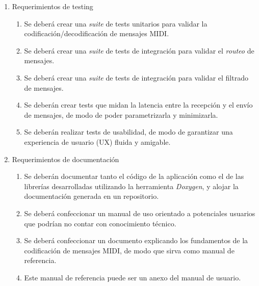 \documentclass[
11pt, %
]{charter}
\begin{document}
\begin{enumerate}
	\item Requerimientos de testing
	\begin{enumerate}
		\item Se deberá crear una \emph{suite} de tests unitarios para validar la codificación/decodificación de mensajes MIDI.
		\item Se deberá crear una \emph{suite} de tests de integración para validar el \emph{routeo} de mensajes.
		\item Se deberá crear una \emph{suite} de tests de integración para validar el filtrado de mensajes.
		\item Se deberán crear tests que midan la latencia entre la recepción y el envío de mensajes, de modo de poder parametrizarla y minimizarla.
		\item Se deberán realizar tests de usabilidad, de modo de garantizar una experiencia de usuario (UX) fluida y amigable.
	\end{enumerate}
	\item Requerimientos de documentación
	\begin{enumerate}
		\item Se deberán documentar tanto el código de la aplicación como el de las librerías desarrolladas utilizando la herramienta \emph{Doxygen}, y alojar la documentación generada en un repositorio.
		\item Se deberá confeccionar un manual de uso orientado a potenciales usuarios que podrían no contar con conocimiento técnico.
		\item Se deberá confeccionar un documento explicando los fundamentos de la codificación de mensajes MIDI, de modo que sirva como manual de referencia.
		\item Este manual de referencia puede ser un anexo del manual de usuario.
	\end{enumerate}


\end{enumerate}
\end{document}
